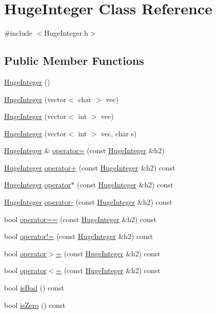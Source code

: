 \hypertarget{classHugeInteger}{}\section{Huge\+Integer Class Reference}
\label{classHugeInteger}


{\ttfamily \#include $<$Huge\+Integer.\+h$>$}

\subsection*{Public Member Functions}
\begin{DoxyCompactItemize}
\item 
\hyperlink{classHugeInteger_ae6ee5a7e63ecd80b9249d062368905d4}{Huge\+Integer} ()
\item 
\hyperlink{classHugeInteger_a7e954c8f3b75af795ad264d42ceb988a}{Huge\+Integer} (vector$<$ char $>$ vec)
\item 
\hyperlink{classHugeInteger_ac1f027abc8c7fd57321a9c006161a4af}{Huge\+Integer} (vector$<$ int $>$ vec)
\item 
\hyperlink{classHugeInteger_aedbf7ae7ff566dac549415d39205dcf6}{Huge\+Integer} (vector$<$ int $>$ vec, char s)
\item 
\hyperlink{classHugeInteger}{Huge\+Integer} \& \hyperlink{classHugeInteger_a21b05accb9d8037d987361c569adcb34}{operator=} (const \hyperlink{classHugeInteger}{Huge\+Integer} \&h2)
\item 
\hyperlink{classHugeInteger}{Huge\+Integer} \hyperlink{classHugeInteger_a3b20d1fc01bc355958e11a286f988605}{operator+} (const \hyperlink{classHugeInteger}{Huge\+Integer} \&h2) const 
\item 
\hyperlink{classHugeInteger}{Huge\+Integer} \hyperlink{classHugeInteger_a40e338d499c8b70be27bf1e5dd0244c8}{operator$\ast$} (const \hyperlink{classHugeInteger}{Huge\+Integer} \&h2) const 
\item 
\hyperlink{classHugeInteger}{Huge\+Integer} \hyperlink{classHugeInteger_ad692378aa02c232eade02c4177984a20}{operator-\/} (const \hyperlink{classHugeInteger}{Huge\+Integer} \&h2) const 
\item 
bool \hyperlink{classHugeInteger_afd8c8c5e61cb6616dcd8672f187e3b98}{operator==} (const \hyperlink{classHugeInteger}{Huge\+Integer} \&h2) const 
\item 
bool \hyperlink{classHugeInteger_a6154b74ff0c6684996295cbc206c780a}{operator!=} (const \hyperlink{classHugeInteger}{Huge\+Integer} \&h2) const 
\item 
bool \hyperlink{classHugeInteger_a7e16c19293c8f8113cd4fb8a4d74d591}{operator$>$=} (const \hyperlink{classHugeInteger}{Huge\+Integer} \&h2) const 
\item 
bool \hyperlink{classHugeInteger_a7cfb61d81ff41194b821ba51fe30a823}{operator$<$=} (const \hyperlink{classHugeInteger}{Huge\+Integer} \&h2) const 
\item 
bool \hyperlink{classHugeInteger_a49c11f16dad4dbb56d277ddb0eb71342}{is\+Bad} () const 
\item 
bool \hyperlink{classHugeInteger_a183190948f2862b4dfd6a10e25a9b9ab}{is\+Zero} () const 
\end{DoxyCompactItemize}
